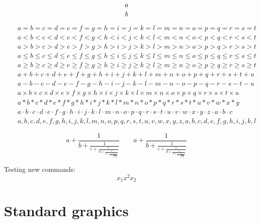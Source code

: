 \documentclass[12pt,a4paper]{article}
\newcommand{\xsb}{x_{1}}
\newcommand{\xsp}{x^{2}}
\newcommand{\xsbnum}[1]{x_{#1}}
\begin{document}
\[
{a \atop b} 
\]

\begin{eqnarray*}
&&a = b = c = d = e = f = g = h = i = j = k = l = m = n = o = p = q = r = s = t\\
&&a < b < c < d < e < f < g < h < i < j < k < l < m < n < o < p < q < r < s < t\\
&&a > b > c > d > e > f > g > h > i > j > k > l > m > n > o > p > q > r > s > t\\
&&a \leq b \leq c \leq d \leq e \leq f \leq g \leq h \leq i \leq j \leq k \leq l \leq m \leq n \leq o \leq p \leq q \leq r \leq s \leq t\\
&&a \geq b \geq c \geq d \geq e \geq f \geq g \geq h \geq i \geq j \geq k \geq l \geq m \geq n \geq o \geq p \geq q \geq r \geq s \geq t\\
&&a + b + c + d + e + f + g + h + i + j + k + l + m + n + o + p + q + r + s + t + u\\
&&a - b - c - d - e - f - g - h - i - j - k - l - m - n - o - p - q - r - s - t - u\\
&&a \times b \times c \times d \times e \times f \times g \times h \times i \times j \times k \times l \times m \times n \times o \times p \times q \times r \times s \times t \times u\\
&&a * b * c * d * e * f * g * h * i * j * k * l * m * n * o * p * q * r * s * t * u * v * w * x * y\\
&&a \cdot b \cdot c \cdot d \cdot e \cdot f \cdot g \cdot h \cdot i \cdot j \cdot k \cdot l \cdot m \cdot n \cdot o \cdot p \cdot q \cdot r \cdot s \cdot t \cdot u \cdot v \cdot w \cdot x \cdot y \cdot z \cdot a \cdot b \cdot c\\
&&a , b , c , d , e , f , g , h , i , j , k , l , m , n , o , p , q , r , s , t , u , v , w , x , y , z , a , b , c , d , e , f, g , h , i , j , k , l
\end{eqnarray*}

\[
a + \frac{1}{b + \frac{1}{c + \frac{1}{d + \frac{1}{e + \frac{1}{f + \frac{1}{g + \frac{1}{h}}}}}}} \qquad a + \frac{1}{\displaystyle b + \frac{1}{\displaystyle c + \frac{1}{\displaystyle d + \frac{1}{\displaystyle e + \frac{1}{\displaystyle f + \frac{1}{\displaystyle g + \frac{1}{h}}}}}}}
\]

Testing new commands:
\[ 
\xsb \xsp \xsbnum{2}
\]

\newpage

\section{Standard graphics}
\end{document}
